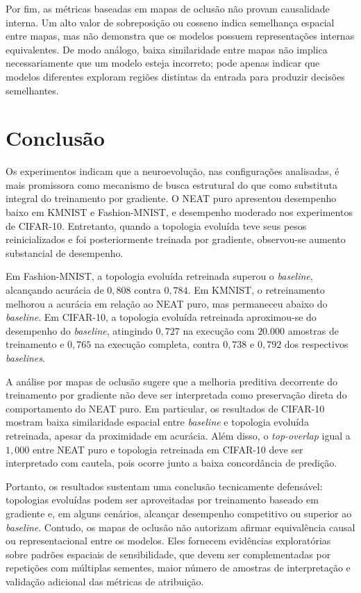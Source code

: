 Por fim, as métricas baseadas em mapas de oclusão não provam causalidade interna. Um alto valor de sobreposição ou cosseno indica semelhança espacial entre mapas, mas não demonstra que os modelos possuem representações internas equivalentes. De modo análogo, baixa similaridade entre mapas não implica necessariamente que um modelo esteja incorreto; pode apenas indicar que modelos diferentes exploram regiões distintas da entrada para produzir decisões semelhantes.

\section{Conclusão}
\label{sec:conclusao}

Os experimentos indicam que a neuroevolução, nas configurações analisadas, é mais promissora como mecanismo de busca estrutural do que como substituta integral do treinamento por gradiente. O NEAT puro apresentou desempenho baixo em KMNIST e Fashion-MNIST, e desempenho moderado nos experimentos de CIFAR-10. Entretanto, quando a topologia evoluída teve seus pesos reinicializados e foi posteriormente treinada por gradiente, observou-se aumento substancial de desempenho.

Em Fashion-MNIST, a topologia evoluída retreinada superou o \textit{baseline}, alcançando acurácia de $0{,}808$ contra $0{,}784$. Em KMNIST, o retreinamento melhorou a acurácia em relação ao NEAT puro, mas permaneceu abaixo do \textit{baseline}. Em CIFAR-10, a topologia evoluída retreinada aproximou-se do desempenho do \textit{baseline}, atingindo $0{,}727$ na execução com $20.000$ amostras de treinamento e $0{,}765$ na execução completa, contra $0{,}738$ e $0{,}792$ dos respectivos \textit{baselines}.

A análise por mapas de oclusão sugere que a melhoria preditiva decorrente do treinamento por gradiente não deve ser interpretada como preservação direta do comportamento do NEAT puro. Em particular, os resultados de CIFAR-10 mostram baixa similaridade espacial entre \textit{baseline} e topologia evoluída retreinada, apesar da proximidade em acurácia. Além disso, o \textit{top-overlap} igual a $1{,}000$ entre NEAT puro e topologia retreinada em CIFAR-10 deve ser interpretado com cautela, pois ocorre junto a baixa concordância de predição.

Portanto, os resultados sustentam uma conclusão tecnicamente defensável: topologias evoluídas podem ser aproveitadas por treinamento baseado em gradiente e, em alguns cenários, alcançar desempenho competitivo ou superior ao \textit{baseline}. Contudo, os mapas de oclusão não autorizam afirmar equivalência causal ou representacional entre os modelos. Eles fornecem evidências exploratórias sobre padrões espaciais de sensibilidade, que devem ser complementadas por repetições com múltiplas sementes, maior número de amostras de interpretação e validação adicional das métricas de atribuição.